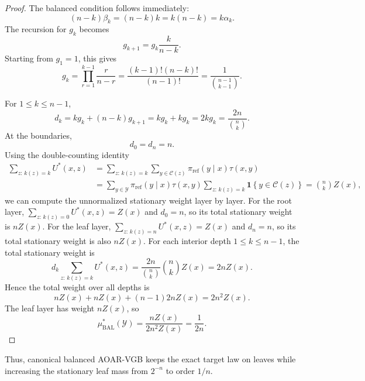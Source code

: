 \documentclass{article}
\numberwithin{theorem}{section}
\numberwithin{proposition}{section}
\numberwithin{corollary}{section}
\numberwithin{lemma}{section}
\numberwithin{conjecture}{section}
\numberwithin{remark}{section}
\numberwithin{definition}{section}
\numberwithin{assumption}{section}
\numberwithin{example}{section}
\newcommand{\calC}{{\mathcal{C}}}
\newcommand{\calY}{{\mathcal{Y}}}
\newcommand{\mbra}[1]{\left\{#1\right\}}
\providecommand{\base}{\pi_{\mathrm{ref}}}
\begin{document}
\begin{proof}
The balanced condition follows immediately:
\begin{equation*}
    (n-k)\beta_k = (n-k)k = k(n-k) = k\alpha_k.
\end{equation*}
The recursion for $g_k$ becomes
\begin{equation*}
    g_{k+1} = g_k\frac{k}{n-k}.
\end{equation*}
Starting from $g_1=1$, this gives
\begin{equation*}
    g_k=\prod_{r=1}^{k-1}\frac{r}{n-r}
    =
    \frac{(k-1)!(n-k)!}{(n-1)!}
    =
    \frac{1}{\binom{n-1}{k-1}}.
\end{equation*}

For $1\le k\le n-1$,
\begin{equation*}
    d_k = k g_k+(n-k)g_{k+1} = k g_k+k g_k = 2k g_k = \frac{2n}{\binom{n}{k}}.
\end{equation*}
At the boundaries,
\begin{equation*}
    d_0=d_n=n.
\end{equation*}
Using the double-counting identity
\begin{align*}
    \sum_{z:\,k(z)=k}U^*(x,z)
    &=
    \sum_{z:\,k(z)=k}\sum_{y\in\calC(z)}\base(y\mid x)\tau(x,y) \\
    &=
    \sum_{y\in\calY}\base(y\mid x)\tau(x,y)
    \sum_{z:\,k(z)=k}\mathbf{1}\mbra{y\in\calC(z)} =
    \binom{n}{k}Z(x),
\end{align*}
we can compute the unnormalized stationary weight layer by layer. For the root layer, $\sum_{z:\,k(z)=0}U^*(x,z)=Z(x)$ and $d_0=n$, so its total stationary weight is $nZ(x)$. For the leaf layer, $\sum_{z:\,k(z)=n}U^*(x,z)=Z(x)$ and $d_n=n$, so its total stationary weight is also $nZ(x)$. For each interior depth $1\le k\le n-1$, the total stationary weight is
\begin{equation*}
    d_k\sum_{z:\,k(z)=k}U^*(x,z)=\frac{2n}{\binom{n}{k}}\binom{n}{k}Z(x)=2nZ(x).
\end{equation*}
Hence the total weight over all depths is
\begin{equation*}
    nZ(x)+nZ(x)+(n-1)2nZ(x)=2n^2Z(x).
\end{equation*}
The leaf layer has weight $nZ(x)$, so
\begin{equation*}
    \mu_{\mathrm{BAL}}^*(\calY)=\frac{nZ(x)}{2n^2Z(x)}=\frac{1}{2n}.
\end{equation*}
\end{proof}

Thus, canonical balanced AOAR-VGB keeps the exact target law on leaves while increasing the stationary leaf mass from $2^{-n}$ to order $1/n$.
\end{document}
